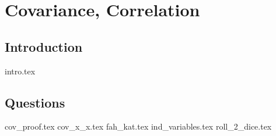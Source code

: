 \documentclass{exam}
\begin{document}
\section{Covariance, Correlation}
\subsection{Introduction}
{intro.tex}
\subsection{Questions}
\begin{questions}
{cov_proof.tex}
{cov_x_x.tex}
{fah_kat.tex}
{ind_variables.tex}
{roll_2_dice.tex}
\end{questions}

\begin{comment}
\section{Linear Least Squares Estimator}
{intro.tex}
\subsection{Questions}
\begin{questions}
{find_L.tex}
{find_from_graph.tex}
\end{questions}
\end{comment}
\end{document}
